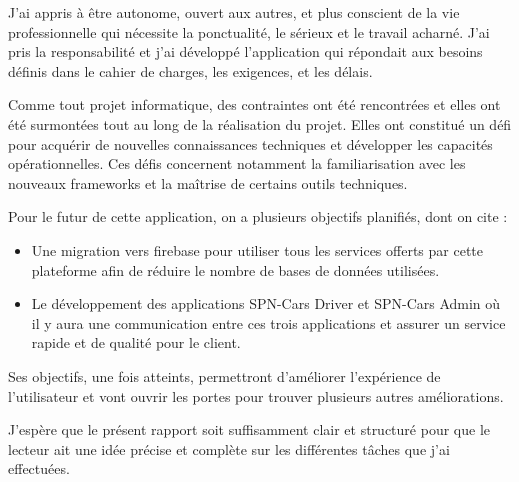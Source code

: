J'ai appris à être autonome, ouvert aux autres, et plus conscient de la vie professionnelle qui nécessite la ponctualité, le sérieux et le travail acharné. J'ai pris la responsabilité et j'ai développé l'application qui répondait aux besoins définis dans le cahier de charges, les exigences, et les délais.

Comme tout projet informatique, des contraintes ont été rencontrées et elles ont été surmontées tout au long de la réalisation du projet. Elles ont constitué un défi pour acquérir de nouvelles connaissances techniques et développer les capacités opérationnelles. Ces défis concernent notamment la familiarisation avec les nouveaux frameworks et la maîtrise de certains outils techniques.

Pour le futur de cette application, on a plusieurs objectifs planifiés, dont on cite :
\begin{itemize}
    \item Une migration vers firebase pour utiliser tous les services offerts par cette plateforme afin de réduire le nombre de bases de données utilisées.
    \item Le développement des applications SPN-Cars Driver et SPN-Cars Admin où il y aura une communication entre ces trois applications et assurer un service rapide et de qualité pour le client.
\end{itemize}
Ses objectifs, une fois atteints, permettront d'améliorer l'expérience de l'utilisateur et vont ouvrir les portes pour trouver plusieurs autres améliorations.

J'espère que le présent rapport soit suffisamment clair et structuré pour que le lecteur ait une idée précise et complète sur les différentes tâches que j'ai effectuées.